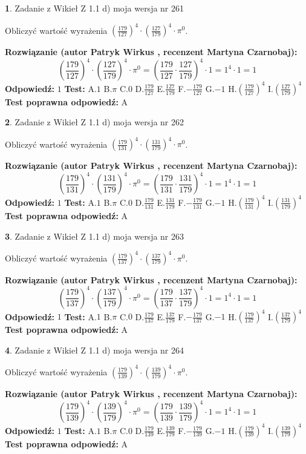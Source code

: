 \documentclass[12pt, a4paper]{article}
\theoremstyle{definition} %
\newtheorem{zad}{}
\newcommand{\zadStart}[1]{\begin{zad}#1\newline}
\newcommand{\zadStop}{\end{zad}}
\newcommand{\rozwStart}[2]{\noindent \textbf{Rozwiązanie (autor #1 , recenzent #2): }\newline}
\newcommand{\rozwStop}{\newline}
\newcommand{\odpStart}{\noindent \textbf{Odpowiedź:}\newline}
\newcommand{\odpStop}{\newline}
\newcommand{\testStart}{\noindent \textbf{Test:}\newline}
\newcommand{\testStop}{\newline}
\newcommand{\kluczStart}{\noindent \textbf{Test poprawna odpowiedź:}\newline}
\newcommand{\kluczStop}{\newline}
\begin{document}
\zadStart{Zadanie z Wikieł Z 1.1 d) moja wersja nr 261}

Obliczyć wartość wyrażenia $(\frac{179}{127})^{4} \cdot (\frac{127}{179})^{4} \cdot \pi^{0}$.
\zadStop
\rozwStart{Patryk Wirkus}{Martyna Czarnobaj}
$$(\frac{179}{127})^{4} \cdot (\frac{127}{179})^{4} \cdot \pi^{0} = (\frac{179}{127} \cdot \frac{127}{179})^{4} \cdot 1 = 1^{4} \cdot 1 = 1$$
\rozwStop
\odpStart
$1$
\odpStop
\testStart
A.$1$ B.$\pi$ C.$0$ D.$\frac{179}{127}$ E.$\frac{127}{179}$
F.$-\frac{179}{127}$ G.$-1$
H.$(\frac{179}{127})^{4}$
I.$(\frac{127}{179})^{4}$
\testStop
\kluczStart
A
\kluczStop



\zadStart{Zadanie z Wikieł Z 1.1 d) moja wersja nr 262}

Obliczyć wartość wyrażenia $(\frac{179}{131})^{4} \cdot (\frac{131}{179})^{4} \cdot \pi^{0}$.
\zadStop
\rozwStart{Patryk Wirkus}{Martyna Czarnobaj}
$$(\frac{179}{131})^{4} \cdot (\frac{131}{179})^{4} \cdot \pi^{0} = (\frac{179}{131} \cdot \frac{131}{179})^{4} \cdot 1 = 1^{4} \cdot 1 = 1$$
\rozwStop
\odpStart
$1$
\odpStop
\testStart
A.$1$ B.$\pi$ C.$0$ D.$\frac{179}{131}$ E.$\frac{131}{179}$
F.$-\frac{179}{131}$ G.$-1$
H.$(\frac{179}{131})^{4}$
I.$(\frac{131}{179})^{4}$
\testStop
\kluczStart
A
\kluczStop



\zadStart{Zadanie z Wikieł Z 1.1 d) moja wersja nr 263}

Obliczyć wartość wyrażenia $(\frac{179}{137})^{4} \cdot (\frac{137}{179})^{4} \cdot \pi^{0}$.
\zadStop
\rozwStart{Patryk Wirkus}{Martyna Czarnobaj}
$$(\frac{179}{137})^{4} \cdot (\frac{137}{179})^{4} \cdot \pi^{0} = (\frac{179}{137} \cdot \frac{137}{179})^{4} \cdot 1 = 1^{4} \cdot 1 = 1$$
\rozwStop
\odpStart
$1$
\odpStop
\testStart
A.$1$ B.$\pi$ C.$0$ D.$\frac{179}{137}$ E.$\frac{137}{179}$
F.$-\frac{179}{137}$ G.$-1$
H.$(\frac{179}{137})^{4}$
I.$(\frac{137}{179})^{4}$
\testStop
\kluczStart
A
\kluczStop



\zadStart{Zadanie z Wikieł Z 1.1 d) moja wersja nr 264}

Obliczyć wartość wyrażenia $(\frac{179}{139})^{4} \cdot (\frac{139}{179})^{4} \cdot \pi^{0}$.
\zadStop
\rozwStart{Patryk Wirkus}{Martyna Czarnobaj}
$$(\frac{179}{139})^{4} \cdot (\frac{139}{179})^{4} \cdot \pi^{0} = (\frac{179}{139} \cdot \frac{139}{179})^{4} \cdot 1 = 1^{4} \cdot 1 = 1$$
\rozwStop
\odpStart
$1$
\odpStop
\testStart
A.$1$ B.$\pi$ C.$0$ D.$\frac{179}{139}$ E.$\frac{139}{179}$
F.$-\frac{179}{139}$ G.$-1$
H.$(\frac{179}{139})^{4}$
I.$(\frac{139}{179})^{4}$
\testStop
\kluczStart
A
\kluczStop
\end{document}
